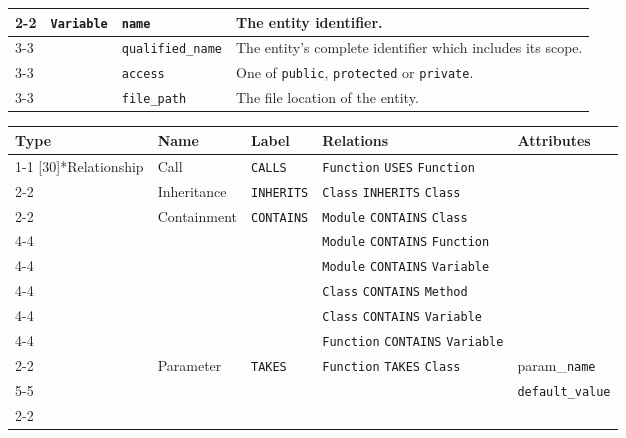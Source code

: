 \begin{tabularx}{\textwidth}{p{1.8cm}llX}
\cmidrule{2-2}\cmidrule{3-3}\cmidrule{4-4}
 & \multirow{4}[8]{*}{\texttt{Variable}} & \texttt{name} & The entity identifier. \\
\cmidrule{3-3}\cmidrule{4-4}
 &  & \texttt{qualified\_\texttt{name}} & The entity's complete identifier which includes its scope. \\
\cmidrule{3-3}\cmidrule{4-4}
 &  & \texttt{access} & One of \texttt{public}, \texttt{protected} or \texttt{private}. \\
\cmidrule{3-3}\cmidrule{4-4}
 &  & \texttt{file\_path} & The file location of the entity. \\
\bottomrule
\end{tabularx}

\begin{tabularx}{\textwidth}{p{1.8cm}llXl}
\toprule
\textbf{Type} & \textbf{Name} & \textbf{Label} & \textbf{Relations} & \textbf{Attributes} \\
\cmidrule{1-1}\cmidrule{2-2}\cmidrule{3-3}\cmidrule{4-4}\cmidrule{5-5}
\multirow{15}[30]{*}{Relationship} & Call & \texttt{CALLS} & \texttt{Function} \texttt{USES} \texttt{Function} &  \\
\cmidrule{2-2}\cmidrule{3-3}\cmidrule{4-4}
 & Inheritance & \texttt{INHERITS} & \texttt{Class} \texttt{INHERITS} \texttt{Class} &  \\
\cmidrule{2-2}\cmidrule{3-3}\cmidrule{4-4}
 & \multirow{6}[12]{*}{Containment} & \multirow{6}[12]{*}{\texttt{CONTAINS}} & \texttt{Module} \texttt{CONTAINS} \texttt{Class} &  \\
\cmidrule{4-4}
 &  &  & \texttt{Module} \texttt{CONTAINS} \texttt{Function} &  \\
\cmidrule{4-4}
 &  &  & \texttt{Module} \texttt{CONTAINS} \texttt{Variable} &  \\
\cmidrule{4-4}
 &  &  & \texttt{Class} \texttt{CONTAINS} \texttt{Method} &  \\
\cmidrule{4-4}
 &  &  & \texttt{Class} \texttt{CONTAINS} \texttt{Variable} &  \\
\cmidrule{4-4}
 &  &  & \texttt{Function} \texttt{CONTAINS} \texttt{Variable} &  \\
\cmidrule{2-2}\cmidrule{3-3}\cmidrule{4-4}\cmidrule{5-5}
 & \multirow{2}[4]{*}{Parameter} & \multirow{2}[4]{*}{\texttt{TAKES}} & \multirow{2}[4]{*}{\texttt{Function} \texttt{TAKES} \texttt{Class}} & param\_\texttt{name} \\
\cmidrule{5-5}
 &  &  &  & \texttt{default\_value} \\
\cmidrule{2-2}\cmidrule{3-3}\cmidrule{4-4}\cmidrule{5-5}

\end{tabularx}
